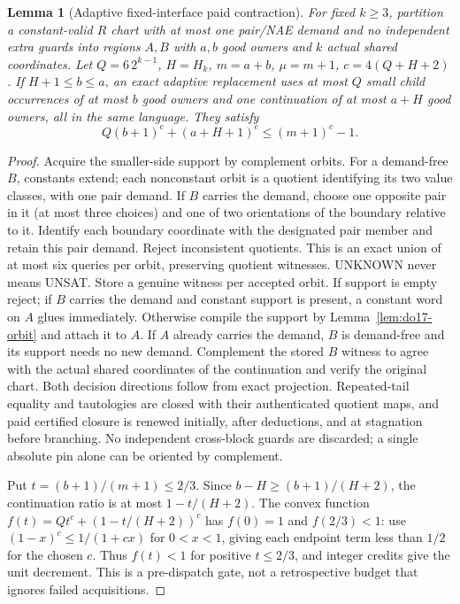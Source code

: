 \documentclass[11pt]{article}
\newtheorem{lemma}[theorem]{Lemma}
\begin{document}
\begin{lemma}[Adaptive fixed-interface paid contraction]\label{lem:do17-credit}
For fixed $k\ge3$, partition a constant-valid $R$ chart with at most one pair/NAE demand and no independent extra guards into regions $A,B$ with $a,b$ good owners and $k$ actual shared coordinates. Let $Q=6\,2^{k-1}$, $H=H_k$, $m=a+b$, $\mu=m+1$, $c=4(Q+H+2)$. If $H+1\le b\le a$, an exact adaptive replacement uses at most $Q$ small child occurrences of at most $b$ good owners and one continuation of at most $a+H$ good owners, all in the same language. They satisfy
\[
 Q(b+1)^c+(a+H+1)^c\le(m+1)^c-1.
\]
\end{lemma}
\begin{proof}
Acquire the smaller-side support by complement orbits. For a demand-free $B$, constants extend; each nonconstant orbit is a quotient identifying its two value classes, with one pair demand. If $B$ carries the demand, choose one opposite pair in it (at most three choices) and one of two orientations of the boundary relative to it. Identify each boundary coordinate with the designated pair member and retain this pair demand. Reject inconsistent quotients. This is an exact union of at most six queries per orbit, preserving quotient witnesses. UNKNOWN never means UNSAT. Store a genuine witness per accepted orbit. If support is empty reject; if $B$ carries the demand and constant support is present, a constant word on $A$ glues immediately. Otherwise compile the support by Lemma~\ref{lem:do17-orbit} and attach it to $A$. If $A$ already carries the demand, $B$ is demand-free and its support needs no new demand. Complement the stored $B$ witness to agree with the actual shared coordinates of the continuation and verify the original chart. Both decision directions follow from exact projection. Repeated-tail equality and tautologies are closed with their authenticated quotient maps, and paid certified closure is renewed initially, after deductions, and at stagnation before branching. No independent cross-block guards are discarded; a single absolute pin alone can be oriented by complement.

Put $t=(b+1)/(m+1)\le2/3$. Since $b-H\ge(b+1)/(H+2)$, the continuation ratio is at most $1-t/(H+2)$. The convex function $f(t)=Qt^c+(1-t/(H+2))^c$ has $f(0)=1$ and $f(2/3)<1$: use $(1-x)^c\le 1/(1+cx)$ for $0<x<1$, giving each endpoint term less than $1/2$ for the chosen $c$. Thus $f(t)<1$ for positive $t\le2/3$, and integer credits give the unit decrement. This is a pre-dispatch gate, not a retrospective budget that ignores failed acquisitions.
\end{proof}
\end{document}
